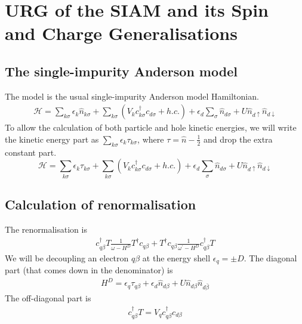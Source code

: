 \chapter{URG of the SIAM and its Spin and Charge Generalisations}\label{siamurg}
\section{The single-impurity Anderson model}
The model is the usual single-impurity Anderson model Hamiltonian.
\begin{equation}\begin{aligned}
	\label{andham}
	\mathcal{H} = \sum_{k\sigma}\epsilon_k \hat n_{k\sigma} + \sum_{k\sigma} \left(V_{k} c^\dagger_{k\sigma} c_{d\sigma} + h.c.\right) + \epsilon_{d}\sum_\sigma  \hat n_{d\sigma} +  U \hat n_{d\uparrow} \hat n_{d\downarrow}
\end{aligned}\end{equation}
To allow the calculation of both particle and hole kinetic energies, we will write the kinetic energy part as \(\sum_{k\sigma}\epsilon_k \tau_{k\sigma}\), where \(\tau = \hat n - \frac{1}{2}\) and drop the extra constant part.
\begin{equation}
	\label{model:siam}
	\mathcal{H} = \sum_{k\sigma}\epsilon_k \tau_{k\sigma} + \sum_{k\sigma} \left(V_{k} c^\dagger_{k\sigma} c_{d\sigma} + h.c.\right) + \epsilon_{d}\sum_\sigma  \hat n_{d\sigma} +  U \hat n_{d\uparrow} \hat n_{d\downarrow}
\end{equation}
\section{Calculation of renormalisation}
The renormalisation is
\begin{equation}\begin{aligned}
\label{newh}
c^\dagger_{q\beta}T \frac{1}{\omega - H^D}T^\dagger c_{q\beta} + T^\dagger c_{q\beta}\frac{1}{\omega^\prime - H^D}c^\dagger_{q\beta}T
\end{aligned}\end{equation}
We will be decoupling an electron \(q\beta\) at the energy shell \(\epsilon_q = \pm D\). The diagonal part (that comes down in the denominator) is
\begin{equation}\begin{aligned}
	\label{term1}
H^D = \epsilon_q \tau_{q\beta} + \epsilon_{d}\hat n_{d\beta} +  U \hat n_{d\beta} \hat n_{d\bar\beta}
\end{aligned}\end{equation}
The off-diagonal part is
\begin{equation}\begin{aligned}
	c^\dagger_{q\beta}T = V_q c^\dagger_{q\beta}c_{d\beta}
\end{aligned}\end{equation}

